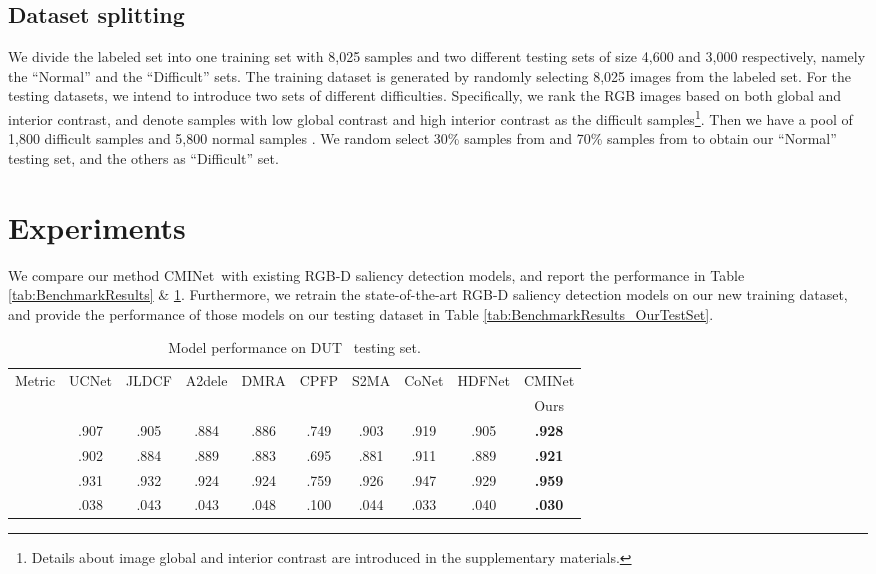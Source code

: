 \documentclass[10pt,twocolumn,letterpaper]{article}
\def\ourmodel{CMINet}
\begin{document}
\subsection{Dataset splitting}
We divide the labeled set into one training set with 8,025 samples and two different testing sets of size 4,600 and 3,000 respectively, namely the \enquote{Normal} and the \enquote{Difficult} sets. The training dataset is generated by randomly selecting
8,025 images from the labeled set. For the testing datasets, we intend to introduce two sets of different difficulties. Specifically, we rank the RGB images based on both global and interior contrast, and denote samples with low global contrast and high interior contrast as the difficult samples\footnote{Details about image global and interior contrast are introduced in the supplementary materials.}. Then we have a pool of 1,800 difficult samples  and 5,800 normal samples . We random select 30\% samples from  and 70\% samples from  to obtain our \enquote{Normal} testing set,
and the others as \enquote{Difficult} set.

\section{Experiments}
We compare our method
\ourmodel~with existing RGB-D saliency detection models,
and report the performance in Table \ref{tab:BenchmarkResults} \& \ref{tab:BenchmarkResults_DUTRGBD}. Furthermore, we retrain the state-of-the-art RGB-D saliency detection models on our new training dataset, and provide the performance of those models on our testing dataset in Table \ref{tab:BenchmarkResults_OurTestSet}.




\begin{table}[t!]
  \centering
  \scriptsize
  \renewcommand{\arraystretch}{1.0}
  \renewcommand{\tabcolsep}{0.7mm}
\caption{Model performance on DUT~\cite{dmra_iccv19} testing set.}
  \label{tab:BenchmarkResults_DUTRGBD}
  \begin{tabular}{r|cccccccc|c}
  \hline
    Metric & UCNet  & JLDCF &  A2dele & DMRA & CPFP & S2MA & CoNet  & HDFNet & \ourmodel \\    
   & \cite{jing2020uc}          
   & \cite{Fu2020JLDCF}      
   & \cite{A2dele_cvpr2020}
   & \cite{dmra_iccv19}
   & \cite{zhao2019Contrast}  
   & \cite{self_attention_rgbd}  
   & \cite{ji2020accurate} 
   & \cite{HDFNet-ECCV2020} 
   & Ours\\
  \hline
  
   & .907 &  .905 & .884 & .886 & .749 & .903 & .919 & .905  & \textbf{.928}  \\
       & .902 &  .884 & .889 & .883 & .695 & .881 & .911 & .889  & \textbf{.921}  \\
         & .931 &  .932 & .924 & .924 & .759 & .926 & .947 & .929  & \textbf{.959}  \\
      & .038 &  .043 & .043 & .048 & .100 & .044 & .033 & .040  & \textbf{.030}  \\ \hline
  \end{tabular}
\end{table}
\end{document}
